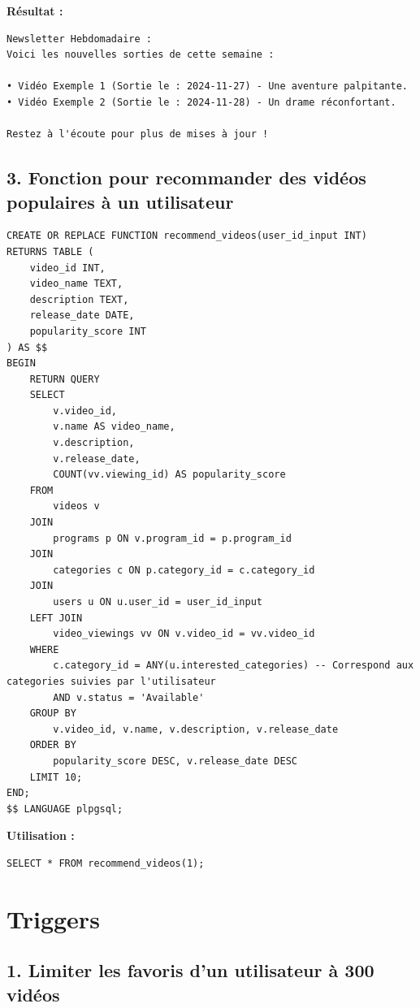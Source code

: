 \documentclass[a4paper, 12pt]{article}
\begin{document}
\textbf{Résultat :}

\begin{verbatim}
Newsletter Hebdomadaire : 
Voici les nouvelles sorties de cette semaine :

• Vidéo Exemple 1 (Sortie le : 2024-11-27) - Une aventure palpitante.
• Vidéo Exemple 2 (Sortie le : 2024-11-28) - Un drame réconfortant.

Restez à l'écoute pour plus de mises à jour !
\end{verbatim}

\subsection*{3. Fonction pour recommander des vidéos populaires à un utilisateur}

\begin{lstlisting}
CREATE OR REPLACE FUNCTION recommend_videos(user_id_input INT)
RETURNS TABLE (
    video_id INT,
    video_name TEXT,
    description TEXT,
    release_date DATE,
    popularity_score INT
) AS $$
BEGIN
    RETURN QUERY
    SELECT 
        v.video_id,
        v.name AS video_name,
        v.description,
        v.release_date,
        COUNT(vv.viewing_id) AS popularity_score
    FROM 
        videos v
    JOIN 
        programs p ON v.program_id = p.program_id
    JOIN 
        categories c ON p.category_id = c.category_id
    JOIN 
        users u ON u.user_id = user_id_input
    LEFT JOIN 
        video_viewings vv ON v.video_id = vv.video_id
    WHERE 
        c.category_id = ANY(u.interested_categories) -- Correspond aux categories suivies par l'utilisateur
        AND v.status = 'Available'
    GROUP BY 
        v.video_id, v.name, v.description, v.release_date
    ORDER BY 
        popularity_score DESC, v.release_date DESC
    LIMIT 10;
END;
$$ LANGUAGE plpgsql;
\end{lstlisting}

\textbf{Utilisation :}

\begin{lstlisting}
SELECT * FROM recommend_videos(1);
\end{lstlisting}

\section*{Triggers}

\subsection*{1. Limiter les favoris d'un utilisateur à 300 vidéos}
\end{document}
